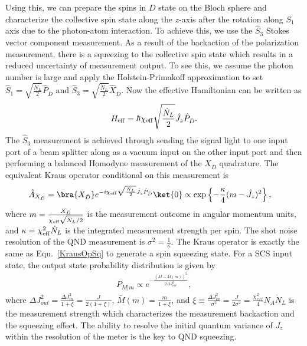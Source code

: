 \documentclass[]{report}
\begin{document}
Using this, we can prepare the spins in $ D $ state on the Bloch sphere and characterize the collective spin state along the $ z $-axis after the rotation along $ S_1 $ axis due to the photon-atom interaction. To achieve this, we use the $ \hat{S}_3 $ Stokes vector component measurement. As a result of the backaction of the polarization measurement, there is a squeezing to the collective spin state which results in a reduced uncertainty of measurement output. To see this, we assume the photon number is large and apply the Holstein-Primakoff approximation to set $ \hat{S}_1=\sqrt{\frac{\dot{N}_L}{2}}\hat{P}_{\bar{D}} $ and $ \hat{S}_3=\sqrt{\frac{\dot{N}_L}{2}}\hat{X}_{\bar{D}} $. Now the effective Hamiltonian can be written as
\begin{align}
H_{\rm eff} = \hbar \chi_{\rm eff} \sqrt{\frac{\dot{N}_L}{2}}\hat{J}_z \hat{P}_{\bar{D}}. 
\end{align}
The $ \hat{S}_3 $ measurement is achieved through sending the signal light to one input port of a beam splitter along as a vacuum input on the other input port and then performing a balanced Homodyne measurement of the $ X_{\bar{D}} $ quadrature. The equivalent Kraus operator conditional on this measurement is 
\begin{align}
\hat{A}_{X_{\bar{D}}} &= \bra{X_{\bar{D}}} e^{-i\chi_{\rm eff} \sqrt{\frac{\dot{N}_L}{2}}\hat{J}_z \hat{P}_{\bar{D}}} \ket{0}\propto \exp\left\{ -\frac{\kappa }{4}(m-\hat{J}_z)^2 \right\},
\end{align} 
where $ m=\frac{X_{\bar{D}}}{\chi_{\rm eff} \sqrt{\dot{N}_L/2}} $ is the measurement outcome in angular momentum units, and $ \kappa =\chi_{\rm eff}^2\dot{N}_L $ is the integrated measurement strength per spin. The shot noise resolution of the QND measurement is $ \sigma^2=\frac{1}{\kappa } $. The Kraus operator is exactly the same as Equ.~\eqref{KrausOpSq} to generate a spin squeezing
 state. For a SCS input state, the output state probability distribution is given by 
\begin{align}
P_{M|m} \propto e^{-\frac{(M-\bar{M}(m))^2}{2\Delta J_{out}^2}},
\end{align}
where $ \Delta J_{out}^2 =\frac{\Delta J_{in}^2}{1+\xi}=\frac{J}{2(1+\xi)} $, $ \bar{M}(m)=\frac{m}{1+\xi} $, and $ \xi\equiv \frac{\Delta J_{in}^2}{\sigma^2}=\frac{J}{2\sigma^2}=\frac{\chi_{e\!f\!f}^2}{4}N_A\dot{N}_L $ is the measurement strength which characterizes the measurement backaction and the squeezing effect. The ability to resolve the initial quantum variance of $ J_z $ within the resolution of the meter is the key to QND squeezing. 
\end{document}
